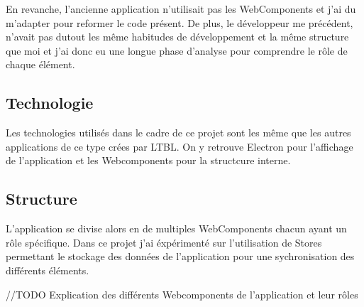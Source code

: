En revanche, l'ancienne application n'utilisait pas les WebComponents et j'ai du m'adapter pour reformer le code présent.
De plus, le développeur me précédent, n'avait pas dutout les même habitudes de développement et la même structure que moi et j'ai donc eu une longue phase d'analyse pour comprendre le rôle de chaque élément.

\subsection{Technologie}
\label{eiffageTablePlanTechnologie}

Les technologies utilisés dans le cadre de ce projet sont les même que les autres applications de ce type crées par LTBL.
On y retrouve Electron pour l'affichage de l'application et les Webcomponents pour la structcure interne.

\subsection{Structure}
\label{eiffageTablePlanStructure}

L'application se divise alors en de multiples WebComponents chacun ayant un rôle spécifique.
Dans ce projet j'ai éxpérimenté sur l'utilisation de Stores permettant le stockage des données de l'application pour une sychronisation des différents éléments.

//TODO Explication des différents Webcomponents de l'application et leur rôles

